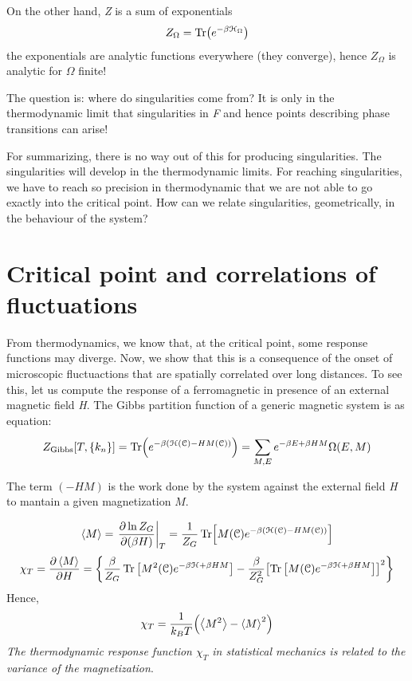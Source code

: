 \documentclass[../../Main/Main.tex]{subfiles}
\begin{document}
On the other hand, \emph{Z} is a sum of exponentials
\begin{equation}
  Z_ \Omega = \Tr(e^{-\beta \mathcal{H}_ \Omega } )
\end{equation}
the exponentials are analytic functions everywhere (they converge), hence \( Z_ \Omega  \) is analytic for \( \Omega  \) finite!

The question is: where do singularities come from?
It is only in the thermodynamic limit that singularities in \emph{F} and hence points describing phase transitions can arise!

For summarizing, there is no way out of this for producing singularities. The singularities will develop in the thermodynamic limits. For reaching singularities, we have to reach so precision in thermodynamic that we are not able to go exactly into the critical point. How can we relate singularities, geometrically, in the behaviour of the system?

 \section{Critical point and correlations of fluctuations}
 From thermodynamics, we know that, at the critical point, some response functions may diverge. Now, we show that this is a consequence of the onset of microscopic fluctuactions that are spatially correlated over long distances.
 To see this, let us compute the response of a ferromagnetic in presence of an external magnetic field \emph{H}.
 The Gibbs partition function of a generic magnetic system is as equation:
 \begin{equation*}
   Z_{\text{Gibbs}} [T,\{ k_n \}  ] = \Tr(e^{-\beta (\mathcal{H} (\mathcal{C}) - H M (\mathcal{C}))} ) = \sum_{M,E}^{} e^{-\beta E + \beta H M} \Omega (E,M)
 \end{equation*}
\begin{remark}
The term \( (- H M) \) is the work done by the system against the external field \emph{H} to mantain a given magnetization \( M \).
\end{remark}
\begin{equation}
  \expval{M} = \eval{ \pdv{\ln{Z_G} }{(\beta H)} }_T = \frac{1}{Z_G} \Tr[M (\mathcal{C}) e^{-\beta ( \mathcal{H} (\mathcal{C}) - H M (\mathcal{C}))} ]
\end{equation}
\begin{equation}
  \chi _T = \pdv{\expval{M} }{H} = \qty{\frac{\beta }{Z_G} \Tr \qty[M^2 (\mathcal{C}) e^{-\beta \mathcal{H} + \beta H M} ] - \frac{\beta }{Z_G^2} \qty[ \Tr \qty[M (\mathcal{C}) e^{-\beta \mathcal{H} + \beta H M } ]  ]^2 }
\end{equation}
Hence,
\begin{equation}
  \chi _T = \frac{1}{k_B T} \qty(\expval{M^2} - \expval{M}^2  )
\end{equation}
\emph{The thermodynamic response function \( \chi _T \) in statistical mechanics is related to the variance of the magnetization}.
\end{document}
